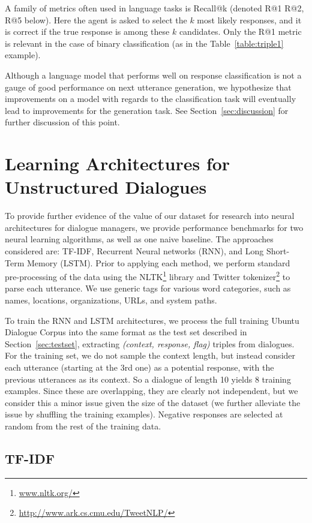 \documentclass[11pt,a4paper]{article}
\begin{document}
A family of metrics often used in language tasks is Recall@k (denoted R@1 R@2, R@5 below).  Here the agent is asked to select the $k$ most likely responses, and it is correct if the true response is among these $k$ candidates.  Only the R@1 metric is relevant in the case of binary classification (as in the Table~\ref{table:triple1} example).

Although a language model that performs well on response classification is not a gauge of good performance on next utterance generation, we hypothesize that improvements on a model with regards to the classification task will eventually lead to improvements for the generation task.  See Section~\ref{sec:discussion} for further discussion of this point.



\section{Learning Architectures for Unstructured Dialogues}
\label{sec:learning}
To provide further evidence of the value of our dataset for research into neural architectures for dialogue managers, we provide performance benchmarks for two neural learning algorithms, as well as one naive baseline. The approaches considered are: TF-IDF, Recurrent Neural networks (RNN), and Long Short-Term Memory (LSTM). Prior to applying each method, we perform standard pre-processing of the data using the NLTK\footnote{\url{www.nltk.org/}} library and Twitter tokenizer\footnote{\url{http://www.ark.cs.cmu.edu/TweetNLP/}} to parse each utterance. We use generic tags for various word categories, such as names, locations, organizations, URLs, and system paths.
  
To train the RNN and LSTM architectures, we process the full training Ubuntu Dialogue Corpus into the same format as the test set described in Section~\ref{sec:testset}, extracting \emph{(context, response, flag)} triples from dialogues.  For the training set, we do not sample the context length, but instead consider each utterance (starting at the 3rd one) as a potential response, with the previous utterances as its context.  So a dialogue of length 10 yields 8 training examples. Since these are overlapping, they are clearly not independent, but we consider this a minor issue given the size of the dataset (we further alleviate the issue by shuffling the training examples).  Negative responses are selected at random from the rest of the training data.


\subsection{TF-IDF}
\end{document}
